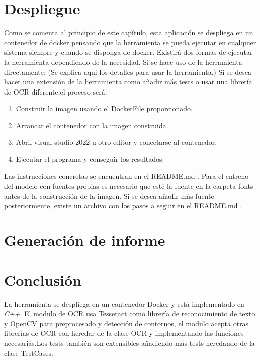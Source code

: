 \section{Despliegue}
Como se comenta al principio de este capítulo, esta aplicación se despliega en un contenedor de docker pensando que la herramienta se pueda ejecutar en cualquier sistema siempre y cuando se disponga de docker.
Existirá dos formas de ejecutar la herramienta dependiendo de la necesidad.
Si se hace uso de la herramienta directamente:
(Se explica aqui los detalles para usar la herramienta.)
Si se desea hacer una extensión de la herramienta como añadir más tests o usar una librería de OCR diferente,el proceso será:
\begin{enumerate}
	\item Construir la imagen usando el DockerFile proporcionado.
	\item Arrancar el contenedor con la imagen construida.
	\item Abril visual studio 2022 u otro editor y conectarse al contenedor.
	\item Ejecutar el programa y conseguir los resultados.
\end{enumerate}
Las instrucciones concretas se encuentran en el README.md .
Para el entreno del modelo con fuentes propias es necesario que esté la fuente en la carpeta fonts antes de la construcción de la imagen. Si se desea añadir más fuente posteriormente, existe un archivo con los pasos a seguir en el README.md .
\section{Generación de informe}

\section{Conclusión}
La herramienta se despliega en un contenedor Docker y está implementado en \emph{C++}. El modulo de OCR usa Tesseract como librería de reconocimiento de texto y OpenCV para preprocesado y detección de contornos, el modulo acepta otras librerías de OCR con heredar de la clase OCR y implementando las funciones necesarias.Los tests también son extensibles añadiendo más tests heredando de la clase TestCases.

